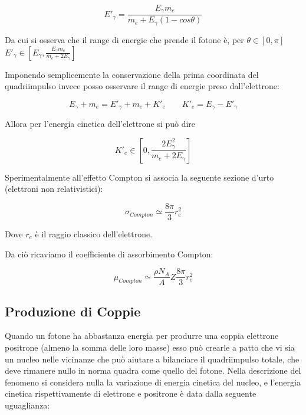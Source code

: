 \documentclass [a4paper, twoside] {book}
\begin{document}
\begin{equation}
E'_{\gamma}=\frac{E_{\gamma}m_e}{m_e+E_{\gamma}(1-cos\theta)}
\end{equation}

Da cui si osserva che il range di energie che prende il fotone è, per $\theta \in [0,\pi]$ $E'_{\gamma} \in [E_{\gamma},\frac{E_{\gamma}m_e}{m_e+2E_{\gamma}}]$

Imponendo semplicemente la conservazione della prima coordinata del quadriimpulso invece posso osservare il range di energie preso dall'elettrone:

\begin{equation}
E_{\gamma}+m_e=E'_{\gamma}+m_e+K'_e \qquad K'_e=E_{\gamma}-E'_{\gamma}
\end{equation}

Allora per l'energia cinetica dell'elettrone si può dire

\begin{equation}
K'_e \in [0, \frac{2E_{\gamma}^2}{m_e+2E_{\gamma}}]
\end{equation}

Sperimentalmente all'effetto Compton si associa la seguente sezione d'urto (elettroni non relativistici):

\begin{equation}
\sigma_{Compton}\simeq\frac{8\pi}{3}r_{e}^2
\end{equation}

Dove $r_{e}$ è il raggio classico dell'elettrone.

Da ciò ricaviamo il coefficiente di assorbimento Compton:

\begin{equation}
\mu_{Compton}\simeq\frac{\rho N_{A}}{A}Z\frac{8\pi}{3}r_{e}^2
\end{equation}

\subsection{Produzione di Coppie}

Quando un fotone ha abbastanza energia per produrre una coppia elettrone positrone (almeno la somma delle loro masse) esso può crearle a patto che vi sia un nucleo nelle vicinanze che può aiutare a bilanciare il quadriimpulso totale, che deve rimanere nullo in norma quadra come quello del fotone. 
Nella descrizione del fenomeno si considera nulla la variazione di energia cinetica del nucleo, e l'energia cinetica rispettivamente di elettrone e positrone è data dalla seguente uguaglianza:
\end{document}
